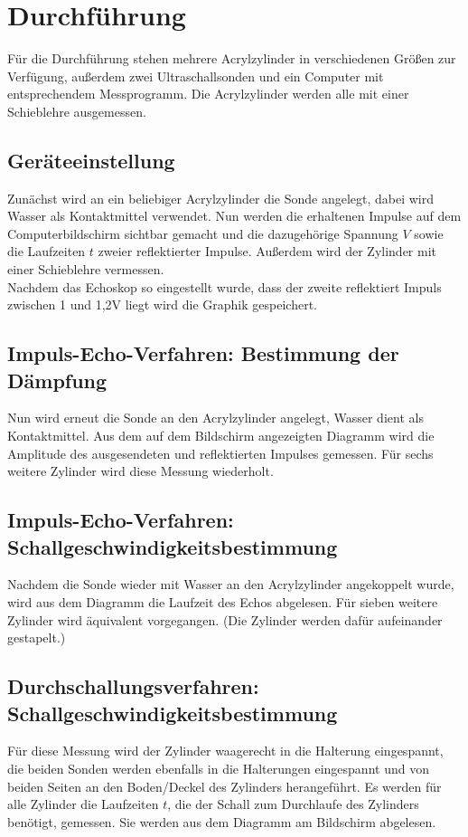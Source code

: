 \section{Durchführung}
\label{sec:Durchführung}

Für die Durchführung stehen mehrere Acrylzylinder in verschiedenen Größen zur
Verfügung, außerdem zwei Ultraschallsonden und ein Computer mit
entsprechendem Messprogramm. Die Acrylzylinder werden alle mit einer
Schieblehre ausgemessen.

\subsection{Geräteeinstellung}

Zunächst wird an ein beliebiger Acrylzylinder die Sonde angelegt, dabei
wird Wasser als Kontaktmittel verwendet. Nun werden die erhaltenen Impulse auf dem
Computerbildschirm sichtbar gemacht und die dazugehörige Spannung $V$ sowie
die Laufzeiten $t$ zweier reflektierter Impulse. Außerdem wird der Zylinder
mit einer Schieblehre vermessen.\\
Nachdem das Echoskop so eingestellt wurde, dass der zweite reflektiert Impuls
zwischen 1 und 1,2\;V liegt wird die Graphik gespeichert.


\subsection{Impuls-Echo-Verfahren: Bestimmung der Dämpfung}
Nun wird erneut die Sonde an den Acrylzylinder angelegt, Wasser dient als Kontaktmittel.
Aus dem auf dem Bildschirm angezeigten Diagramm wird die Amplitude
des ausgesendeten und reflektierten Impulses gemessen.
Für sechs weitere Zylinder wird diese Messung wiederholt.

\subsection{Impuls-Echo-Verfahren: Schallgeschwindigkeitsbestimmung}
Nachdem die Sonde wieder mit Wasser an den Acrylzylinder angekoppelt wurde, wird
aus dem Diagramm die Laufzeit des Echos abgelesen. Für sieben weitere
Zylinder wird äquivalent vorgegangen. (Die Zylinder werden dafür aufeinander gestapelt.)

\subsection{Durchschallungsverfahren: Schallgeschwindigkeitsbestimmung}
Für diese Messung wird der Zylinder waagerecht in die Halterung eingespannt, die
beiden Sonden werden ebenfalls in die Halterungen eingespannt und von beiden
Seiten an den Boden/Deckel des Zylinders herangeführt. Es werden für alle Zylinder
die Laufzeiten $t$, die der Schall zum Durchlaufe des Zylinders benötigt, gemessen.
Sie werden aus dem Diagramm am Bildschirm abgelesen.


